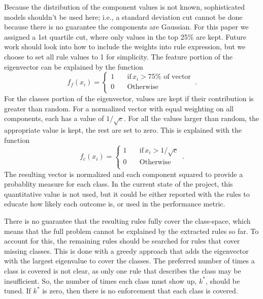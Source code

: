 \documentclass[10pt]{article}
\begin{document}
Because the distribution of the component values is not known, sophisticated models shouldn't be used here; i.e., a standard deviation cut cannot be done because there is no guarantee the components are Gaussian. For this paper we assigned a 1st quartile cut, where only values in the top 25\% are kept. Future work should look into how to include the weights into rule expression, but we choose to set all rule values to 1 for simplicity. The feature portion of the eigenvector can be explained by the function
\begin{equation}
f_f(x_i)=\begin{cases}
          1 \quad &\text{if} \, x_i > 75\% \text{ of vector} \\
          0 \quad &\text{Otherwise} \\
     \end{cases} \, .
\end{equation}
For the classes portion of the eigenvector, values are kept if their contribution is greater than random. For a normalized vector with equal weighting on all components, each has a value of $1/\sqrt{c}$. For all the values larger than random, the appropriate value is kept, the rest are set to zero. This is explained with the function
\begin{equation}
f_c(x_i)=\begin{cases}
          1 \quad &\text{if} \, x_i > 1/\sqrt{c} \\
          0 \quad &\text{Otherwise} \\
     \end{cases} \, .
\end{equation}
The resulting vector is normalized and each component squared to provide a probablity measure for each class. In the current state of the project, this quantitative value is not used, but it could be either reported with the rules to educate how likely each outcome is, or used in the performance metric.

There is no guarantee that the resulting rules fully cover the class-space, which means that the full problem cannot be explained by the extracted rules so far. To account for this, the remaining rules should be searched for rules that cover missing classes. This is done with a greedy approach that adds the eigenvector with the largest eigenvalue to cover the classes. The preferred number of times a class is covered is not clear, as only one rule that describes the class may be insufficient. So, the number of times each class must show up, $k^*$, should be tuned. If $k^*$ is zero, then there is no enforcement that each class is covered. 
\end{document}
